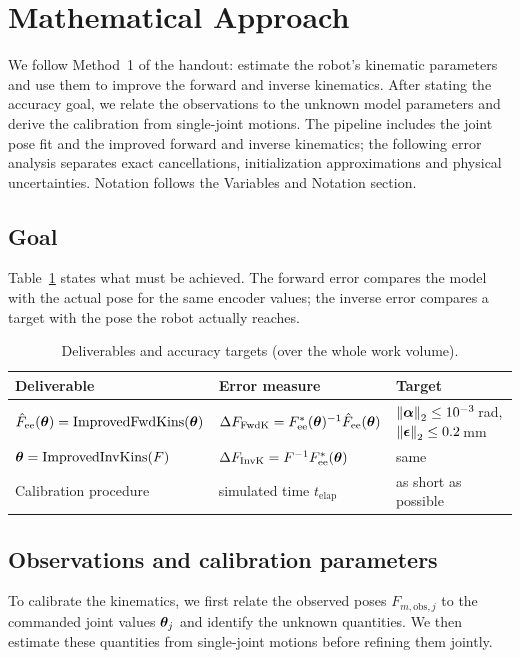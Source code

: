 \documentclass[../main.tex]{subfiles}
\begin{document}
\section{Mathematical Approach}\label{sec:math}
We follow Method~1 of the handout: estimate the robot's kinematic parameters and use them to improve the forward and inverse kinematics. After stating the accuracy goal, we relate the observations to the unknown model parameters and derive the calibration from single-joint motions. The pipeline includes the joint pose fit and the improved forward and inverse kinematics; the following error analysis separates exact cancellations, initialization approximations and physical uncertainties. Notation follows the Variables and Notation section.

\subsection{Goal}\label{sec:math-problem}
Table~\ref{tab:goal} states what must be achieved. The forward error compares the model with the actual pose for the same encoder values; the inverse error compares a target with the pose the robot actually reaches.

\begin{table}[H]
\centering\small
\caption{Deliverables and accuracy targets (over the whole work volume).}\label{tab:goal}
\begin{tabular}{@{}lll@{}}
\toprule
Deliverable & Error measure & Target \\\midrule
$\hat F_{\mathrm{ee}}(\bm{\theta})=\operatorname{ImprovedFwdKins}(\bm{\theta})$ & $\Delta F_{\mathrm{FwdK}}=F^*_{\mathrm{ee}}(\bm{\theta})^{-1}\hat F_{\mathrm{ee}}(\bm{\theta})$ & $\left\|\bm{\alpha}\right\|_2\leq10^{-3}$\,rad, $\left\|\bm{\epsilon}\right\|_2\leq0.2$\,mm \\
$\bm{\theta}=\operatorname{ImprovedInvKins}(F)$ & $\Delta F_{\mathrm{InvK}}=F^{-1}F^*_{\mathrm{ee}}(\bm{\theta})$ & same \\
Calibration procedure & simulated time $t_{\mathrm{elap}}$ & as short as possible \\
\bottomrule
\end{tabular}
\end{table}

\subsection{Observations and calibration parameters}
To calibrate the kinematics, we first relate the observed poses $F_{m,\mathrm{obs},j}$ to the commanded joint values $\bm{\theta}_j$ and identify the unknown quantities. We then estimate these quantities from single-joint motions before refining them jointly.
\end{document}

